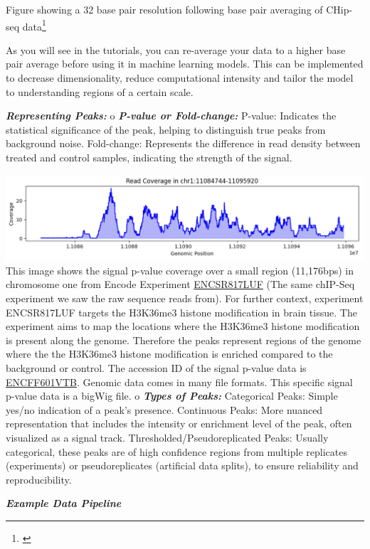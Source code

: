\documentclass[
]{book}
\begin{document}
Figure showing a 32 base pair resolution following base pair averaging of CHip-seq data\footnote{\citet{patel2024}}

As you will see in the tutorials, you can re-average your data to a higher base pair average before using it in machine learning models. This can be implemented to decrease dimensionality, reduce computational intensity and tailor the model to understanding regions of a certain scale.

\textbf{\emph{Representing Peaks:}}
o \textbf{\emph{P-value or Fold-change:}}
P-value: Indicates the statistical significance of the peak, helping to distinguish true peaks from background noise.
Fold-change: Represents the difference in read density between treated and control samples, indicating the strength of the signal.

\includegraphics{images/coverage_p.png}
This image shows the signal p-value coverage over a small region (11,176bps) in chromosome one from Encode Experiment \href{https://www.encodeproject.org/experiments/ENCSR817LUF/}{ENCSR817LUF} (The same chIP-Seq experiment we saw the raw sequence reads from). For further context, experiment ENCSR817LUF targets the H3K36me3 histone modification in brain tissue. The experiment aims to map the locations where the H3K36me3 histone modification is present along the genome. Therefore the peaks represent regions of the genome where the the H3K36me3 histone modification is enriched compared to the background or control. The accession ID of the signal p-value data is \href{https://www.encodeproject.org/files/ENCFF601VTB/}{ENCFF601VTB}. Genomic data comes in many file formats. This specific signal p-value data is a bigWig file.
o \textbf{\emph{Types of Peaks:}}
Categorical Peaks: Simple yes/no indication of a peak's presence.
Continuous Peaks: More nuanced representation that includes the intensity or enrichment level of the peak, often visualized as a signal track.
Thresholded/Pseudoreplicated Peaks: Usually categorical, these peaks are of high confidence regions from multiple replicates (experiments) or pseudoreplicates (artificial data splits), to ensure reliability and reproducibility.

\textbf{\emph{Example Data Pipeline}}
\end{document}
